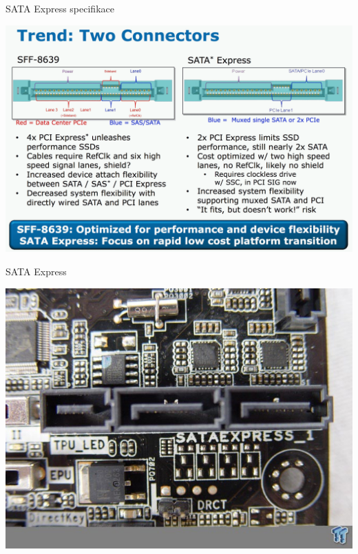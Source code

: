 \documentclass[aspectratio=43]{beamer}
\begin{document}
\begin{frame}{SATA Express specifikace}
	\begin{center}
		\includegraphics[width=0.8\linewidth]{extrahovane_obrazky/img_2_page17_0.png}
	\end{center}
	
\end{frame}


\begin{frame}{SATA Express}
	 
	\begin{center}
		\includegraphics[width=0.8\linewidth]{extrahovane_obrazky/img_2_page18_0.jpeg}
	\end{center}
	
\end{frame}
\end{document}
